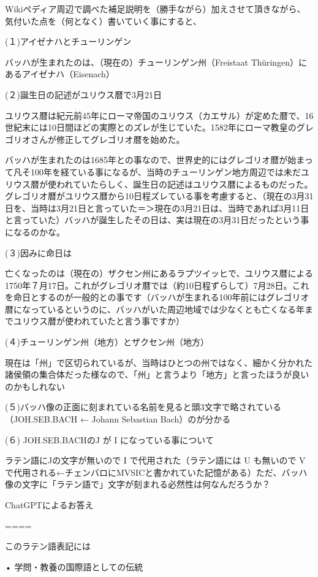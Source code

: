 \documentclass[facebook_diary.tex]{subfiles}
\begin{document}
Wikiぺディア周辺で調べた補足説明を（勝手ながら）加えさせて頂きながら、気付いた点を（何となく）書いていく事にすると、


(１)アイゼナハとチューリンゲン

バッハが生まれたのは、（現在の）チューリンゲン州（Freistaat Thüringen）にあるアイゼナハ（Eisenach）


(２)誕生日の記述がユリウス暦で3月21日

ユリウス暦は紀元前45年にローマ帝国のユリウス（カエサル）が定めた暦で、16世紀末には10日間ほどの実際とのズレが生じていた。1582年にローマ教皇のグレゴリオさんが修正してグレゴリオ暦を始めた。

バッハが生まれたのは1685年との事なので、世界史的にはグレゴリオ暦が始まって凡そ100年を経ている事になるが、当時のチューリンゲン地方周辺では未だユリウス暦が使われていたらしく、誕生日の記述はユリウス暦によるものだった。グレゴリオ暦がユリウス暦から10日程ズレている事を考慮すると、（現在の3月31日を、当時は3月21日と言っていた＝＞現在の3月21日は、当時であれば3月11日と言っていた）バッハが誕生したその日は、実は現在の3月31日だったという事になるのかな。


(３)因みに命日は

亡くなったのは（現在の）ザクセン州にあるラプツイッヒで、ユリウス暦による1750年７月17日。これがグレゴリオ暦では（約10日程ずらして）7月28日。これを命日とするのが一般的との事です（バッハが生まれる100年前にはグレゴリオ暦になっているというのに、バッハがいた周辺地域では少なくとも亡くなる年までユリウス暦が使われていたと言う事ですか）


(４)チューリンゲン州（地方）とザクセン州（地方）

現在は「州」で区切られているが、当時はひとつの州ではなく、細かく分かれた諸侯領の集合体だった様なので、「州」と言うより「地方」と言ったほうが良いのかもしれない


(５)バッハ像の正面に刻まれている名前を見ると頭3文字で略されている（JOH.SEB.BACH ← Johann Sebastian Bach）のが分かる


(６) JOH.SEB.BACHのJ が I になっている事について

ラテン語にJの文字が無いので I で代用された（ラテン語には U も無いので V で代用される←チェンバロにMVSICと書かれていた記憶がある）ただ、バッハ像の文字に「ラテン語で」文字が刻まれる必然性は何なんだろうか？


ChatGPTによるお答え

====

このラテン語表記には

• 学問・教養の国際語としての伝統
\end{document}
